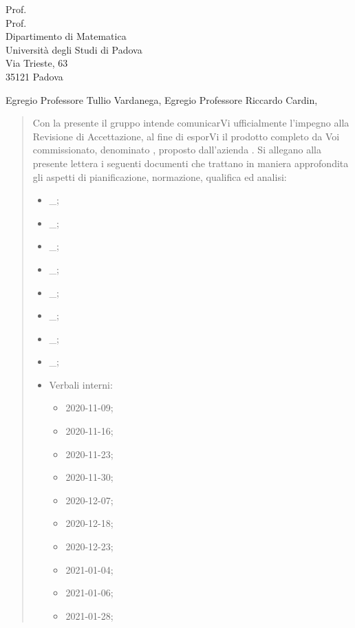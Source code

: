 \documentclass[a4paper,12pt]{letteracdp}
\date{27 maggio 2021}
\begin{document}
\thispagestyle{empty}

\begin{letter}{
	Prof. \Tullio{} \\
	Prof. \Riccardo{} \\
	Dipartimento di Matematica \\
	Università degli Studi di Padova \\
	Via Trieste, 63 \\
	35121 Padova}
	
\opening{Egregio Professore Tullio Vardanega, \newline
Egregio Professore Riccardo Cardin,}

\begin{quotation}
	\noindent 
	Con la presente il gruppo \gruppo{} intende comunicarVi ufficialmente l'impegno alla Revisione di Accettazione, al fine di esporVi il prodotto completo da Voi commissionato, denominato \progetto{}, proposto dall’azienda \proponente.\newline
	Si allegano alla presente lettera i seguenti documenti che trattano in maniera approfondita gli aspetti di pianificazione, normazione, qualifica ed analisi:
	\begin{itemize}
		\item \docAdR{}\_\versAdR;
		\item \docG{}\_\versGlo;
		\item \docNdP{}\_\versNdP;
		\item \docPdP{}\_\versPdP;
		\item \docPdQ{}\_\versPdQ;
		\item \docMU{}\_\versMU;
		\item \docMS{}\_\versMS;
		\item \docSdF{}\_\versSdF;
		\item Verbali interni:
		\begin{itemize}
			\item \docVI{}2020-11-09;
			\item \docVI{}2020-11-16;
			\item \docVI{}2020-11-23;
			\item \docVI{}2020-11-30;
			\item \docVI{}2020-12-07;
			\item \docVI{}2020-12-18;
			\item \docVI{}2020-12-23;
			\item \docVI{}2021-01-04;
			\item \docVI{}2021-01-06;
			\item \docVI{}2021-01-28;

\end{itemize}
\end{itemize}
\end{quotation}
\end{letter}
\end{document}
